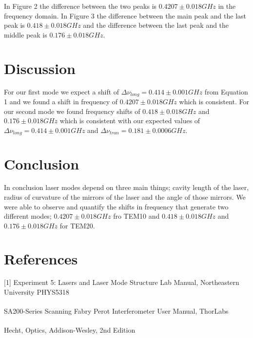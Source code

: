 \documentclass{article}
\begin{document}
In Figure 2 the difference between the two peaks is $0.4207 \pm 0.018 GHz$ in the frequency domain.  In Figure 3 the difference between the main peak and the last peak is $0.418 \pm 0.018 GHz$ and the difference between the last peak and the middle peak is $0.176 \pm 0.018 GHz$.  



\section{Discussion}

For our first mode we expect a shift of $\Delta\nu_{long}=0.414 \pm 0.001 GHz$ from Equation 1 and we found a shift in frequency of $0.4207 \pm 0.018 GHz$ which is consistent.  For our second mode we found frequency shifts of $0.418 \pm 0.018 GHz$ and $0.176 \pm 0.018 GHz$ which is consistent with our expected values of $\Delta\nu_{long}=0.414 \pm 0.001 GHz$ and $\Delta\nu_{tran}=0.181 \pm 0.0006 GHz$.

\section{Conclusion}

In conclusion laser modes depend on three main things; cavity length of the laser, radius of curvature of the mirrors of the laser and the angle of those mirrors.  We were able to observe and quantify the shifts in frequency that generate two different modes; $0.4207 \pm 0.018 GHz$ fro TEM10 and $0.418 \pm 0.018 GHz$ and $0.176 \pm 0.018 GHz$ for TEM20.

\section{References}

[1] Experiment 5: Lasers and Laser Mode Structure Lab Manual, Northeastern University PHYS5318
\\
\\
\noindent [2] SA200-Series Scanning Fabry Perot Interferometer User Manual, ThorLabs
\\
\\
\noindent [3] Hecht, Optics, Addison-Wesley, 2nd Edition
\end{document}
